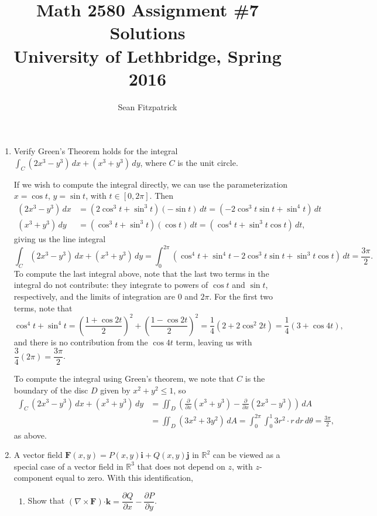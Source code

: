\documentclass[letterpaper,12pt]{article}
\title{Math 2580 Assignment \#7 Solutions\\University of Lethbridge, Spring 2016}
\author{Sean Fitzpatrick}
\newcommand{\di}{\displaystyle}
\newcommand{\R}{\mathbb{R}}
\newcommand{\F}{\mathbf{F}}
\newcommand{\dotp}{\boldsymbol{\cdot}}
\renewcommand{\i}{\mathbf{i}}
\renewcommand{\j}{\mathbf{j}}
\renewcommand{\k}{\mathbf{k}}
\begin{document}
 \maketitle


\begin{enumerate}
\item Verify Green's Theorem holds for the integral $\di \int_C (2x^3-y^3)\,dx+(x^3+y^3)\,dy$, where $C$ is the unit circle.

\bigskip

If we wish to compute the integral directly, we can use the parameterization $x=\cos t$, $y=\sin t$, with $t\in [0,2\pi]$. Then
\begin{align*}
 (2x^3-y^3)\, dx & = (2\cos^3t+\sin^3t)(-\sin t)\,dt = (-2\cos^3t\sin t+\sin^4 t)\,dt\\
 (x^3+y^3)\,dy & = (\cos^3t+\sin^3t)(\cos t)\,dt = (\cos^4t+\sin^3t\cos t)\,dt,
\end{align*}
giving us the line integral
\[
 \int_C (2x^3-y^3)\,dx+(x^3+y^3)\,dy = \int_0^{2\pi}(\cos^4 t+\sin^4t -2\cos^3t\sin t+\sin^3 t\cos t)\,dt = \frac{3\pi}{2}.
\]
To compute the last integral above, note that the last two terms in the integral do not contribute: they integrate to powers of $\cos t$ and $\sin t$, respectively, and the limits of integration are 0 and $2\pi$. For the first two terms, note that
\[
 \cos^4 t + \sin^4 t = \left(\frac{1+\cos 2t}{2}\right)^2+\left(\frac{1-\cos 2t}{2}\right)^2 = \frac{1}{4}(2+2\cos^2 2t) = \frac{1}{4}(3+\cos 4t),
\]
and there is no contribution from the $\cos 4t$ term, leaving us with $\dfrac{3}{4}(2\pi) = \dfrac{3\pi}{2}$.

To compute the integral using Green's theorem, we note that $C$ is the boundary of the disc $D$  given by $x^2+y^2\leq 1$, so
\begin{align*}
 \int_C (2x^3-y^3)\,dx+(x^3+y^3)\,dy & = \iint_D\left(\frac{\partial}{\partial x}(x^3+y^3)-\frac{\partial}{\partial x}(2x^3-y^3)\right)\,dA\\
& = \iint_D (3x^2+3y^2)\,dA = \int_0^{2\pi}\int_0^1 3r^2\cdot r\,dr\,d\theta = \frac{3\pi}{2},
\end{align*}
as above.



\item A vector field $\F(x,y) = P(x,y)\i+Q(x,y)\j$ in $\R^2$ can be viewed as a special case of a vector field in $\R^3$ that does not depend on $z$, with $z$-component equal to zero. With this identification,
\begin{enumerate}
 \item Show that $(\nabla\times\F)\dotp \k = \dfrac{\partial Q}{\partial x}-\dfrac{\partial P}{\partial y}$.


\end{enumerate}
\end{enumerate}
\end{document}
